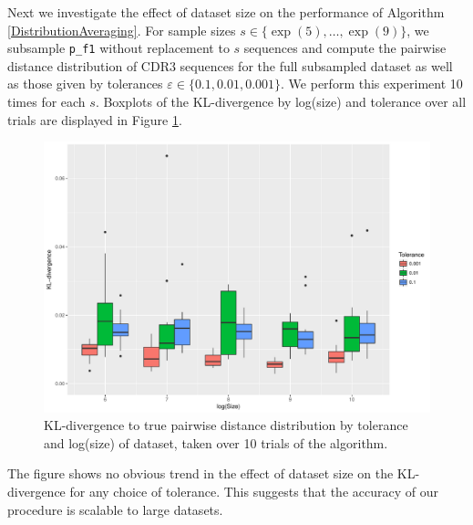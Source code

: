\documentclass{article}
\begin{document}
Next we investigate the effect of dataset size on the performance of Algorithm \ref{DistributionAveraging}.
For sample sizes $s \in \{\exp(5), \dotsc, \exp(9)\}$, we subsample \texttt{p\_f1} without replacement to $s$ sequences and compute the pairwise distance distribution of CDR3 sequences for the full subsampled dataset as well as those given by tolerances $\varepsilon \in \{0.1, 0.01, 0.001\}$.  
We perform this experiment 10 times for each $s$.
Boxplots of the KL-divergence by log(size) and tolerance over all trials are displayed in Figure \ref{fig:Sizes}.
\begin{figure}
    \includegraphics[width=\linewidth]{Figures/PairwiseDistance/div_by_size_and_tol.pdf}
    \caption{KL-divergence to true pairwise distance distribution by tolerance and log(size) of dataset, taken over 10 trials of the algorithm.}
    \label{fig:Sizes}
\end{figure}
The figure shows no obvious trend in the effect of dataset size on the KL-divergence for any choice of tolerance.
This suggests that the accuracy of our procedure is scalable to large datasets.
\end{document}
